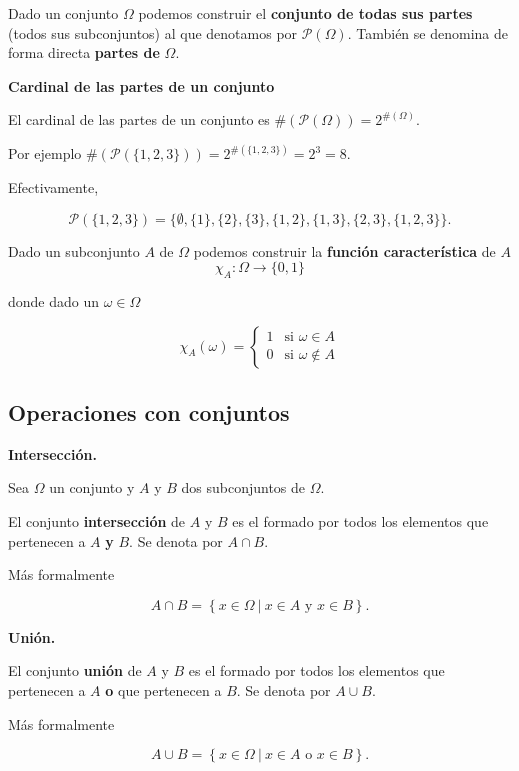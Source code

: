 \documentclass[
  letterpaper,
  DIV=11,
  numbers=noendperiod]{scrreprt}
\begin{document}
Dado un conjunto \(\Omega\) podemos construir el \textbf{conjunto de
todas sus partes} (todos sus subconjuntos) al que denotamos por
\(\mathcal{P}(\Omega)\). También se denomina de forma directa
\textbf{partes de} \(\Omega\).

\textbf{Cardinal de las partes de un conjunto}

El cardinal de las partes de un conjunto es
\(\#(\mathcal{P}(\Omega))=2^{\#(\Omega)}.\)

Por ejemplo
\(\#\left(\mathcal{P}(\{1,2,3\})\right)=2^{\#(\{1,2,3\})}=2^3=8.\)

Efectivamente,

\[\mathcal{P}(\{1,2,3\})=\{\emptyset,\{1\},\{2\},\{3\},\{1,2\},\{1,3\},\{2,3\},\{1,2,3\}\}.\]

Dado un subconjunto \(A\) de \(\Omega\) podemos construir la
\textbf{función característica} de \(A\) \[\chi_A:\Omega \to \{0,1\}\]

donde dado un \(\omega\in \Omega\)

\[
\chi_A(\omega)=
\left\{
\begin{array}{ll}
1 &  \mbox{si }\omega \in A\\
0 &  \mbox{si }\omega \not\in A
\end{array}
\right.
\]

\hypertarget{operaciones-con-conjuntos}{%
\subsection{Operaciones con conjuntos}\label{operaciones-con-conjuntos}}

\textbf{Intersección.}

Sea \(\Omega\) un conjunto y \(A\) y \(B\) dos subconjuntos de
\(\Omega\).

El conjunto \textbf{intersección} de \(A\) y \(B\) es el formado por
todos los elementos que pertenecen a \(A\) \textbf{y} \(B\). Se denota
por \(A\cap B\).

Más formalmente

\[
A\cap B=\left\{x\in\Omega \ \big|\  x\in A \mbox{ y } x\in B\right\}.
\]

\textbf{Unión.}

El conjunto \textbf{unión} de \(A\) y \(B\) es el formado por todos los
elementos que pertenecen a \(A\) \textbf{o} que pertenecen a \(B\). Se
denota por \(A\cup B\).

Más formalmente

\[
A\cup B=\left\{x\in\Omega\ \big|\  x\in A \mbox{ o } x\in B\right\}.
\]
\end{document}
